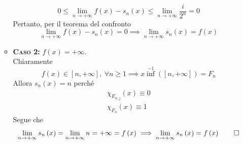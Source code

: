 \begin{demonstration}
\begin{itemize}
\begin{itemize}
\begin{equation*}
	0\leq \lim_{n\to+\infty}f\left(x\right)-s_n\left(x\right)\leq \lim_{n\to+\infty}\frac{i}{2^n}=0
\end{equation*}
Pertanto, per il teorema del confronto
\begin{equation*}
	\lim_{n\to+\infty}f\left(x\right)-s_n\left(x\right)=0\implies \lim_{n\to+\infty}s_n\left(x\right)=f\left(x\right)
\end{equation*}
\item \textbf{\textsc{Caso 2:}} $f\left(x\right)=+\infty$.\\
Chiaramente
\begin{equation*}
	f\left(x\right)\in\left[n,+\infty\right],\ \forall n\geq 1\implies x\inf^{-1}\left(\left[n,+\infty\right]\right)=F_n
\end{equation*}
Allora $s_n\left(x\right)=n$ perché
\begin{gather*}
	\chi_{E_{n,j}}\left(x\right)\equiv 0\\
	\chi_{F_n}\left(x\right)\equiv 1
\end{gather*}
Segue che
\begin{equation*}
	\lim_{n\to+\infty}s_n\left(x\right)=\lim_{n\to+\infty}n=+\infty=f\left(x\right)\implies \lim_{n\to+\infty}s_n\left(x\right)=f\left(x\right)\qedhere
\end{equation*}
\end{itemize}
\end{itemize}
\end{demonstration}

